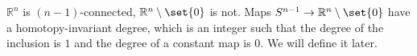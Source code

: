 $\mathbb{R}^n$ is $(n-1)$-connected, $\mathbb{R}^n\setminus\set{0}$ is not.
Maps $S^{n-1}\to \mathbb{R}^n\setminus\set{0}$ have a homotopy-invariant degree, which is an
integer such that the degree of the inclusion is $1$ and the degree of a constant
map is $0$. We will define it later.

